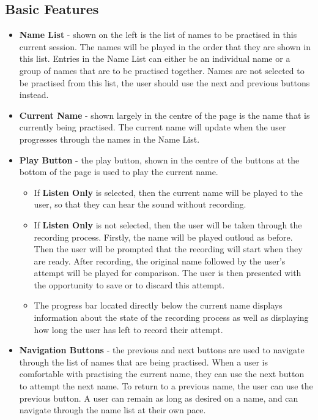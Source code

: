 \documentclass{article}
\begin{document}
\subsection{Basic Features}

\begin{itemize}
	\item \textbf{Name List} - shown on the left is the list of names to be
	practised in this current session. The names will be played in the order
	that  they are shown in this list. Entries in the Name List can either be an
	individual name or a group of names that are to  be practised together.
	Names are not selected to be practised from this list, the user should use
	the next and previous buttons instead.

	\item \textbf{Current Name} - shown largely in the centre of the page is the
	name that is currently being practised. The current name will update when
	the user progresses through the names in the Name List.

	\item \textbf{Play Button} - the play button, shown in the centre of the buttons
	at the bottom of the page is used to play the current name.

	\begin{itemize}
		\item If \textbf{Listen Only} is selected, then the current name will be played
		to the user, so that they can hear the sound without recording.

		\item If \textbf{Listen Only} is not selected, then the user will be
		taken through the recording process. Firstly, the name will be played
		outloud as before. Then the user will be prompted that the recording
		will start when they are ready. After recording, the original name
		followed by the user's attempt will be played for comparison. The user
		is then presented with the opportunity to save or to discard this
		attempt.

    	\item The progress bar located directly below the current name displays
    	information about the state of the recording process as well as
    	displaying how long the user has left to record their attempt.

	\end{itemize}

	\item \textbf{Navigation Buttons} - the previous and next buttons are used
	to navigate through the list of names that are being  practised. When a user
	is comfortable with practising the current name, they can use the next
	button to attempt the next name.  To return to a previous name, the user can
	use the previous button. A user can remain as long as desired on a name, and
	can  navigate through the name list at their own pace.


\end{itemize}
\end{document}
